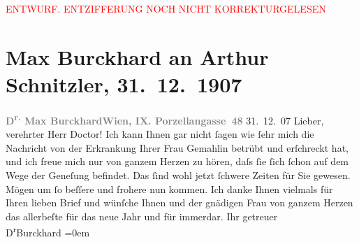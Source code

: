 
\begin{center}
            \textcolor{red}{ENTWURF. ENTZIFFERUNG NOCH NICHT KORREKTURGELESEN}
                      \end{center}
            
               \section[Max Burckhard an Arthur Schnitzler, 31. 12. 1907]{ Max Burckhard an Arthur Schnitzler, 31. 12. 1907}\nopagebreak{}\rehead{ }\begin{ledgroupsized}[t]{13cm}\normalsize\beginnumbering{} \toendnotes[C]{\smallbreak\pagebreak[2]} 
\toendnotes[C]{\smallbreak}\pstart
           \noindent{}{\pb}\textcolor{gray}{\textbf{D\textsuperscript{r.} Max Burckhard}}\hfill \textcolor{gray}{\textbf{Wien, IX. Porzellangasse 48}}{ }31. 12. 07\pend
           \pstart
           \raggedleft{}\textcolor{gray}{\textbf{}}\hspace*{3.5em}\pend
           \pstart{}Lieber, verehrter Herr Doctor!\pend\pstart
           Ich kann Ihnen gar nicht ſagen wie ſehr mich die Nachricht von der Erkrankung
                    Ihrer Frau Gemahlin betrübt
                    und erſchreckt hat, und ich freue mich nur von ganzem Herzen zu hören, daſs ſie
                    ſich ſchon auf dem Wege der Geneſung befindet. Das ſind wohl jetzt ſchwere
                    Zeiten {\pb}für Sie gewesen. Mögen um ſo
                    beſſere und frohere nun kommen.\pend
           \pstart
           Ich danke Ihnen vielmals für Ihren lieben Brief und wünſche Ihnen und der
                    gnädigen Frau von ganzem
                    Herzen das allerbeſte für das neue Jahr und für immerdar.\pend
           \pstart
           Ihr getreuer{\\[\baselineskip]}\spacefill\mbox{D\textsuperscript{r}Burckhard}\pend
           \leftskip=0em{}\endnumbering{}\end{ledgroupsized}  \newcommand{\dateiname}{L01747}\newcommand{\titel}{Max Burckhard an Arthur Schnitzler, 31. 12. 1907}\newcommand{\editorInnen}{Martin Anton Müller und Gerd-Hermann Susen}
      
